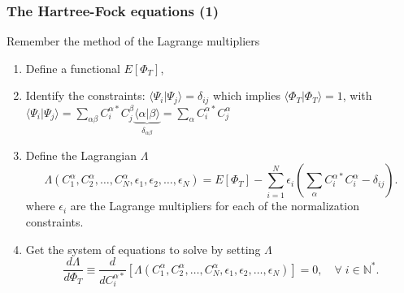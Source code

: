 \documentclass[xcolor=pdftex,hyperref={pdfpagelabels=false},table]{beamer}
\begin{document}
\begin{frame}
\frametitle{The Hartree-Fock equations (1)}
\begin{scriptsize}
\begin{alertblock}{Remember the method of the Lagrange multipliers}
\begin{enumerate}
 \item Define a functional $E [ \Phi_T ]$,
\item  Identify the constraints: $\langle \Psi_i |\Psi_j \rangle= \delta_{ij}$ which implies $\langle \Phi_T | \Phi_T  \rangle=1$, \newline with $\langle \Psi_i |\Psi_j \rangle = \sum_{\alpha \beta} C_i^{\alpha *} C_j^\beta \underbrace{\langle \alpha | \beta \rangle}_{\delta_{ \alpha \beta } } = \sum_{\alpha} C_i^{\alpha *} C_j^\alpha $
\item Define the Lagrangian $\Lambda$
\begin{equation}
\Lambda(C_1^{\alpha},C_2^{\alpha},\dots,C_N^{\alpha},\epsilon_1,\epsilon_2,\dots,\epsilon_N)= E[\Phi_T] - \sum_{i=1}^N \epsilon_i \left( \sum_\alpha C_i^{\alpha *} C_i^{\alpha} - \delta_{ij} \right).
\end{equation}
where $\epsilon_i$ are the Lagrange multipliers for each of the normalization constraints.
\item Get the system of equations to solve by setting $\Lambda$
\begin{equation}
\frac{d \Lambda}{d\Phi_T}  \equiv \frac{d}{dC_i^{\alpha *}} \left[ \Lambda(C_1^{\alpha},C_2^{\alpha},\dots,C_N^{\alpha},\epsilon_1,\epsilon_2,\dots,\epsilon_N) \right] = 0, \quad \forall \; i \in \mathbb{N}^*.
\end{equation}
\end{enumerate}
\end{alertblock}
\end{scriptsize}
\end{frame}
\end{document}
